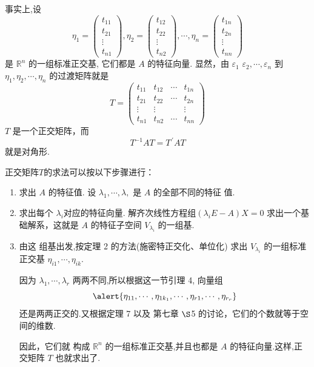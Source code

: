 \documentclass[13pt]{beamer}
\def\Rn{\mathbb{R}^n}
\begin{document}
\begin{frame}


事实上,设
\[
\eta_{1}=\left(\begin{array}{c}
t_{11} \\
t_{21} \\
\vdots \\
t_{n 1}
\end{array}\right), \eta_{2}=\left(\begin{array}{c}
t_{12} \\
t_{22} \\
\vdots \\
t_{n 2}
\end{array}\right), \cdots, \eta_{n}=\left(\begin{array}{c}
t_{1 n} \\
t_{2 n} \\
\vdots \\
t_{n n}
\end{array}\right)
\]
是 $\Rn$ 的一组标准正交基, 它们都是 $A$ 的特征向量.
显然，由 ${\varepsilon}_{1}$
${\varepsilon}_{2}, \cdots, {\varepsilon}_{n}$ 到 ${\eta}_{1}, {\eta}_{2}, \cdots, {\eta}_{n}$ 的\alert{过渡矩阵}就是
\[
{T}=\left(\begin{array}{cccc}
t_{11} & t_{12} & \cdots & t_{1 n} \\
t_{21} & t_{22} & \cdots & t_{2 n} \\
\vdots & \vdots & & \vdots \\
t_{n 1} & t_{n 2} & \cdots & t_{n n}
\end{array}\right)
\]
$T$ 是一个正交矩阵，而
\[
{T}^{-1} {A} {T}={T}^{\, \prime} {A} {T}
\]
就是对角形.
\end{frame}

\begin{frame}
正交矩阵$T$的求法可以按以下步骤进行：



\begin{enumerate}
	\item 求出 $A$ 的\alert{特征值}. 设 $\lambda_{1}, \cdots, \lambda,$ 是 ${A}$ 的全部不同的特征
	值. 
	\item 求出每个 $\lambda_{i}$对应的\alert{特征向量}. 解齐次线性方程组$\left(\lambda_{i} {E}-{A}\right)X={0}$
	求出一个基础解系，这就是 $A$ 的特征子空间 $V_{\lambda_{i}}$ 的一组基.
	\item 
	由这 组基出发,按定理 2 的方法(\alert{施密特正交化}、{单位化}) 求出 $V_{\lambda_{i}}$ 的一组标准正交基 ${\eta}_{i 1}, \cdots,{\eta}_{i k}$.  
		
	因为 $\lambda_{1}, \cdots, \lambda_{r}$ 两两不同,所以根据这一节引理 4, 向量组
	$$\alert{{\eta}_{11}, \cdots, {\eta}_{1 k_{1}}, \cdots, {\eta}_{r 1}, \cdots, {\eta}_{r_{r}}}$$ 还是两两正交的.又根据定理 7 以及
	第七章 $\S$5 的讨论，它们的个数就等于空间的维数.
	
		因此，它们就 构成 $\Rn$ 的一组\alert{标准正交基},并且也都是 $A$ 的特征向量.这样,正 交矩阵 $T$ 也就求出了. 
\end{enumerate}
\end{frame}
\end{document}
